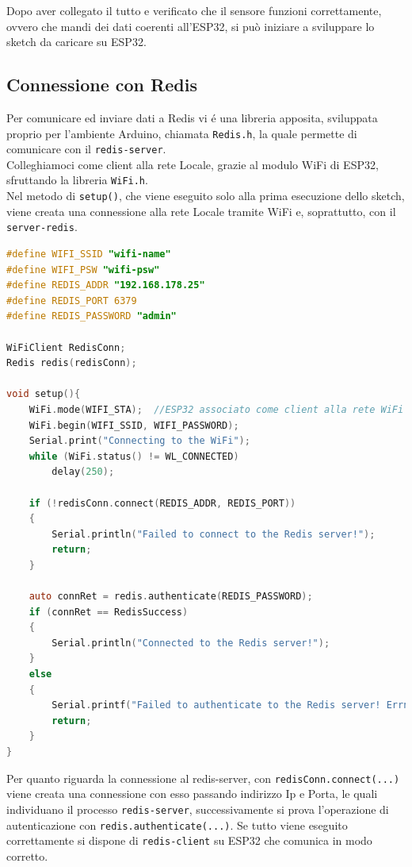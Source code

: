 Dopo aver collegato il tutto e verificato che il sensore funzioni correttamente, ovvero che mandi dei dati
coerenti all'ESP32, si può iniziare a sviluppare lo sketch da caricare su ESP32.

\subsection{Connessione con Redis}
Per comunicare ed inviare dati a Redis vi é una libreria apposita, sviluppata proprio per l'ambiente Arduino, chiamata \texttt{Redis.h},
la quale permette di comunicare con il \texttt{redis-server}.\\
Colleghiamoci come client alla rete Locale, grazie al modulo WiFi di ESP32, sfruttando la libreria \texttt{WiFi.h}.\\
Nel metodo di \texttt{setup()}, che viene eseguito solo alla prima esecuzione dello sketch, viene creata una connessione alla rete Locale tramite WiFi e, soprattutto, con il \texttt{server-redis}.
\begin{lstlisting}[autogobble, style=c, language=C]
#define WIFI_SSID "wifi-name"
#define WIFI_PSW "wifi-psw"
#define REDIS_ADDR "192.168.178.25"
#define REDIS_PORT 6379
#define REDIS_PASSWORD "admin"

WiFiClient RedisConn;
Redis redis(redisConn);

void setup(){
    WiFi.mode(WIFI_STA);  //ESP32 associato come client alla rete WiFi
    WiFi.begin(WIFI_SSID, WIFI_PASSWORD);
    Serial.print("Connecting to the WiFi");
    while (WiFi.status() != WL_CONNECTED)
        delay(250);

    if (!redisConn.connect(REDIS_ADDR, REDIS_PORT))
    {
        Serial.println("Failed to connect to the Redis server!");
        return;
    }

    auto connRet = redis.authenticate(REDIS_PASSWORD);
    if (connRet == RedisSuccess)
    {
        Serial.println("Connected to the Redis server!");
    }
    else
    {
        Serial.printf("Failed to authenticate to the Redis server! Errno: %d\n", connRet);
        return;
    }
}
\end{lstlisting}

Per quanto riguarda la connessione al redis-server,  con \texttt{redisConn.connect(...)} viene creata una connessione con esso
passando indirizzo Ip e Porta, le quali individuano il processo \texttt{redis-server}, successivamente si prova l'operazione di autenticazione con
\texttt{redis.authenticate(...)}.
Se tutto viene eseguito correttamente si dispone di \texttt{redis-client} su ESP32 che comunica in modo corretto.


